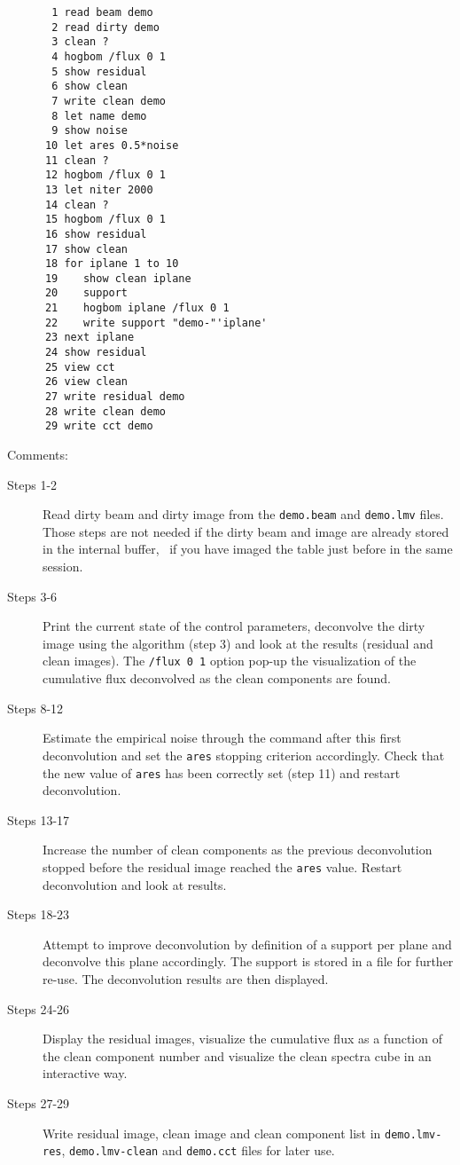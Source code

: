 \begin{verbatim}
       1 read beam demo
       2 read dirty demo
       3 clean ?
       4 hogbom /flux 0 1
       5 show residual
       6 show clean
       7 write clean demo
       8 let name demo
       9 show noise
      10 let ares 0.5*noise
      11 clean ?
      12 hogbom /flux 0 1
      13 let niter 2000
      14 clean ?
      15 hogbom /flux 0 1
      16 show residual
      17 show clean
      18 for iplane 1 to 10
      19    show clean iplane
      20    support
      21    hogbom iplane /flux 0 1
      22    write support "demo-"'iplane'
      23 next iplane
      24 show residual
      25 view cct
      26 view clean
      27 write residual demo
      28 write clean demo
      29 write cct demo
\end{verbatim}
Comments:
\begin{description}
\item[Steps 1-2] Read dirty beam and dirty image from the
  \texttt{demo.beam} and \texttt{demo.lmv} files. Those steps are not
  needed if the dirty beam and image are already stored in the internal
  buffer, \ie\ if you have imaged the \uv{} table just before in the same
  \imager{} session.
\item[Steps 3-6] Print the current state of the control parameters,
  deconvolve the dirty image using the  algorithm (step 3) and
  look at the results (residual and clean images).  The \texttt{/flux 0 1}
  option pop-up the visualization of the cumulative flux deconvolved as the
  clean components are found.
\item[Steps 8-12] Estimate the empirical noise through the 
  command after this first deconvolution and set the \texttt{ares} stopping
  criterion accordingly. Check that the new value of \texttt{ares} has been
  correctly set (step 11) and restart deconvolution.
\item[Steps 13-17] Increase the number of clean components as the previous
  deconvolution stopped before the residual image reached the
  \texttt{ares} value. Restart deconvolution and look at results.
\item[Steps 18-23] Attempt to improve deconvolution by definition of a
  support per plane and deconvolve this plane accordingly. The support is
  stored in a file for further re-use. The deconvolution results are then displayed.
\item[Steps 24-26] Display the residual images, visualize the cumulative 
  flux as a function of the clean component number and visualize the clean 
  spectra cube in an interactive way.
\item[Steps 27-29] Write residual image, clean image and clean component
  list in \texttt{demo.lmv-res}, \texttt{demo.lmv-clean} and
  \texttt{demo.cct} files for later use. 
\end{description}
